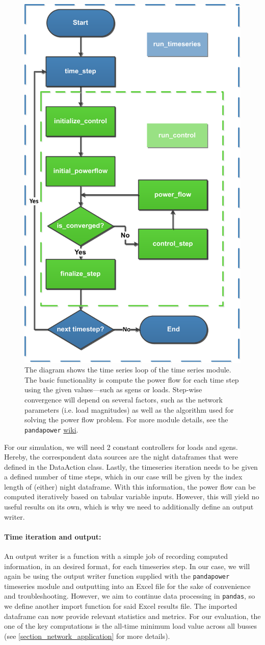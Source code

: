 \documentclass[a4paper,10pt]{report}
\begin{document}
\FloatBarrier
\begin{figure}[htpb]
		\centering
		\includegraphics[width=0.35\linewidth]{timeseries_module_diag.pdf}
		\caption{The diagram shows the time series loop of the time series module. The basic functionality is compute the power flow for each time step using the given values---such as sgens or loads. Step-wise convergence will depend on several factors, such as the network parameters (i.e. load magnitudes) as well as the algorithm used for solving the power flow problem. For more module details, see the \texttt{pandapower}  \href{https://pandapower.readthedocs.io/en/v2.10.1/timeseries/timeseries_loop.html}{wiki}.}
		\label{timeseries_module_diag}
	\end{figure}
\FloatBarrier

For our simulation, we will need 2 constant controllers for loads and sgens. Hereby, the correspondent data sources are the night dataframes that were defined in the DataAction class. Lastly, the timeseries iteration needs to be given a defined number of time steps, which in our case will be given by the index length of (either) night dataframe. With this information, the power flow can be computed iteratively based on tabular variable inputs. However, this will yield no useful results on its own, which is why we need to additionally define an output writer.

\paragraph{Time iteration and output:} An output writer is a function with a simple job of recording computed information, in an desired format, for each timeseries step. In our case, we will again be using the output writer function supplied with the \texttt{pandapower} timeseries module and outputting into an Excel file for the sake of convenience and troubleshooting. However, we aim to continue data processing in \texttt{pandas}, so we define another import function for said Excel results file. The imported dataframe can now provide relevant statistics and metrics. For our evaluation, the one of the key computations is the all-time minimum load value across all busses (see \cref{section_network_application} for more details).
\end{document}
